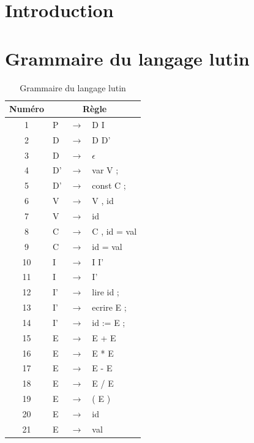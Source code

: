 




\newpage

\tableofcontents

\listoffigures

\listoftables

\newpage

\section{Introduction}


\section{Grammaire du langage lutin}


\begin{table}[h]
	\centering
	\begin{tabular}{|c|l c l|}
		\hline
		Numéro & \multicolumn{3}{c|}{Règle} \\
		\hline
		1 & P & $\rightarrow$ & D I \\
		2 & D & $\rightarrow$ & D D’ \\
		3 & D & $\rightarrow$ & $\epsilon$ \\
		4 & D’ & $\rightarrow$ & var V ; \\
		5 & D’ & $\rightarrow$ & const C ; \\
		6 & V & $\rightarrow$ & V , id \\
		7 & V & $\rightarrow$ & id \\
		8 & C & $\rightarrow$ & C , id = val \\
		9 & C & $\rightarrow$ & id = val \\
		10 & I & $\rightarrow$ & I I’ \\
		11 & I & $\rightarrow$ & I’ \\
		12 & I’ & $\rightarrow$ & lire id ; \\
		13 & I’ & $\rightarrow$ & ecrire E ; \\
		14 & I’ & $\rightarrow$ & id := E ; \\
		15 & E & $\rightarrow$ & E + E \\
		16 & E & $\rightarrow$ & E * E \\
		17 & E & $\rightarrow$ & E - E \\
		18 & E & $\rightarrow$ & E / E \\
		19 & E & $\rightarrow$ & ( E ) \\
		20 & E & $\rightarrow$ & id \\
		21 & E & $\rightarrow$ & val \\
		\hline
	\end{tabular}
	\caption{Grammaire du langage lutin}
\end{table}



